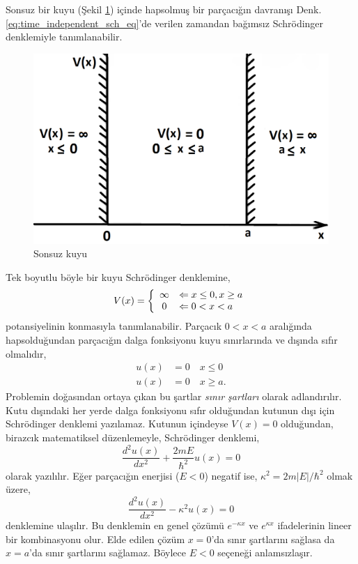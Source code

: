 \documentclass[a4paper,12pt, twoside]{article}
\begin{document}
Sonsuz bir kuyu (Şekil \ref{fig:infinite_well}) içinde hapsolmuş bir parçacığın davranışı Denk. \ref{eq:time_independent_sch_eq}'de verilen zamandan bağımsız Schrödinger denklemiyle tanımlanabilir.
\begin{figure}[hbtp]
\center
\includegraphics[scale=.65]{infinite_well.png}
\caption{Sonsuz kuyu}
\label{fig:infinite_well}
\end{figure}
Tek boyutlu böyle bir kuyu Schrödinger denklemine,
\begin{equation}
V ( x ) = \left\{
\begin{array} { c l } 
{ \infty } & { \Leftarrow x \leq 0 , x \geq a } \\ 
{ 0 } & { \Leftarrow 0 < x < a } \end{array} 
\right.
\label{eq:infinite_well}
\end{equation}
potansiyelinin konmasıyla tanımlanabilir. Parçacık $0<x<a$ aralığında hapsolduğundan parçacığın dalga fonksiyonu kuyu sınırlarında ve dışında sıfır olmalıdır,
\begin{align*} 
u ( x ) &= 0 \quad x \leq 0 \\ 
u ( x ) &= 0 \quad x \geq a .
\end{align*}
Problemin doğasından ortaya çıkan bu şartlar \emph{sınır şartları} olarak adlandırılır. Kutu dışındaki her yerde dalga fonksiyonu sıfır olduğundan kutunun dışı için Schrödinger denklemi yazılamaz. Kutunun içindeyse $V(x)=0$ olduğundan, birazcık matematiksel düzenlemeyle, Schrödinger denklemi,
\begin{equation}
\frac { d ^ { 2 } u ( x ) } { d x ^ { 2 } } + \frac { 2 m E } { \hbar ^ { 2 } } u ( x ) = 0
\label{eq:infinite_well_schrodinger}
\end{equation}
olarak yazılılır. Eğer parçacığın enerjisi ($E<0$) negatif ise, $\kappa ^ { 2 } = 2 m | E | / \hbar ^ { 2 }$ olmak üzere,
\begin{equation}
\frac { d ^ { 2 } u ( x ) } { d x ^ { 2 } } - \kappa ^ { 2 } u ( x ) = 0
\end{equation}
denklemine ulaşılır. Bu denklemin en genel çözümü $e ^ { - \kappa x }$ ve $e ^ {\kappa x }$ ifadelerinin lineer bir kombinasyonu olur. Elde edilen çözüm $x=0$'da sınır şartlarını sağlasa da $x=a$'da sınır şartlarını sağlamaz. Böylece $E<0$ seçeneği anlamsızlaşır.
\end{document}
